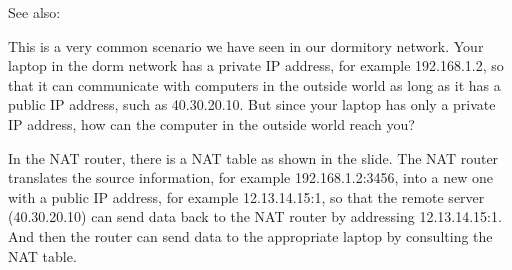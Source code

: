
See also: 

This is a very common scenario we have seen in our dormitory network. Your laptop in the
dorm network has a private IP address, for example 192.168.1.2, so that it can communicate with computers in the outside
world as long as it has a public IP address, such as 40.30.20.10. But since your laptop
has only a private IP address, how can the computer in the outside world reach you?

In the NAT router, there is a NAT table as shown in the slide. The NAT router translates
the source information, for example 192.168.1.2:3456, into a new one with a public IP
address, for example 12.13.14.15:1, so that the remote server (40.30.20.10) can send data
back to the NAT router by addressing 12.13.14.15:1. And then the router can send data to
the appropriate laptop by consulting the NAT table.

